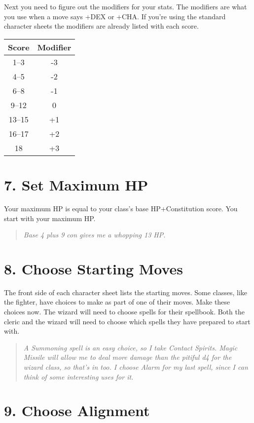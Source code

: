 Next you need to figure out the modifiers for your stats. The modifiers are what you use when a move says +DEX or +CHA\@. If you're using the standard character sheets the modifiers are already listed with each score.
\begin{center}
\begin{tabular}{|c|c|}\hline
Score & Modifier \\ \hline
1--3 & -3\\ \hline
4--5 & -2\\ \hline
6--8 & -1\\ \hline
9--12 & 0\\ \hline
13--15 & +1\\ \hline
16--17 & +2\\ \hline
18 & +3\\ \hline
\end{tabular}
\end{center}
\section*{7. Set Maximum HP}

Your maximum HP is equal to your class's base HP+Constitution score. You start with your maximum HP\@.

\begin{quote}
\emph{Base 4 plus 9 con gives me a whopping 13 HP\@. }
\end{quote}
\section*{8. Choose Starting Moves} 

The front side of each character sheet lists the starting moves. Some classes, like the fighter, have choices to make as part of one of their moves. Make these choices now. The wizard will need to choose spells for their spellbook. Both the cleric and the wizard will need to choose which spells they have prepared to start with.

\begin{quote}
\emph{A Summoning spell is an easy choice, so I take Contact Spirits. Magic Missile will allow me to deal more damage than the pitiful d4 for the wizard class, so that's in too. I choose Alarm for my last spell, since I can think of some interesting uses for it.}
\end{quote}
\section*{9. Choose Alignment}

